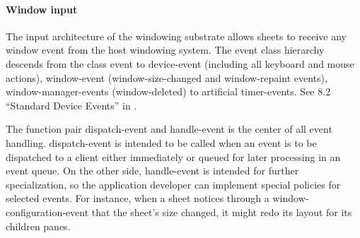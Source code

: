 \documentclass[twocolumn,a4paper]{article}
\newcommand {\concept} [1] {{\sl #1}\index{#1}}
\newcommand {\code}[1]{{\sffamily #1}}
\newcommand {\CLIM}{\textsc{clim}}
\begin{document}
\paragraph*{Window input} The input architecture of the windowing
substrate allows sheets to receive any window event from the host
windowing system. The event class hierarchy descends from the class
\code{event} to \code{device-event} (including all keyboard and mouse
actions), \code{window-event} (window-size-changed and window-repaint
events), \code{window-manager-events} (window-deleted) to artificial
\code{timer-events}. See 8.2 ``Standard Device Events'' in
\cite{clim-spec}.

The function pair \code{dispatch-event} and \code{handle-event} is the
center of all event handling. \code{dispatch-event} is intended to be
called when an event is to be dispatched to a client either
immediately or queued for later processing in an event queue. On the
other side, \code{handle-event} is intended for further
specialization, so the application developer can implement special
policies for selected events. For instance, when a sheet notices
through a \code{window-configuration-event} that the sheet's size
changed, it might redo its layout for its children panes.


\end{document}
